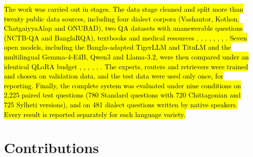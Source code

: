 \hl{The work was carried out in stages. The data stage cleaned and split
more than twenty public data sources, including four dialect corpora
(Vashantor, Kothon, ChatgaiyyaAlap and ONUBAD), two QA datasets with
unanswerable questions (NCTB-QA and BanglaRQA), textbooks and medical
resources \cite{faria2023vashantor}, \cite{kothon2026}, \cite{chatgaiyyaalap2025}, \cite{sultana2025onubad}, \cite{nctbqa}, \cite{ekram2022banglarqa},
\cite{khan2023nervous}, \cite{aurpa2026banglameder}. Seven open models, including the Bangla-adapted
TigerLLM and TituLM and the multilingual Gemma-4-E4B, Qwen3 and
Llama-3.2, were then compared under an identical QLoRA budget \cite{raihan2025tigerllm},
\cite{titulm2025}, \cite{gemma4}, \cite{qwen3}, \cite{meta2024llama32}, \cite{dettmers2023qlora}. The experts, routers
and retrievers were trained and chosen on validation data, and the test
data were used only once, for reporting. Finally, the complete system
was evaluated under nine conditions on 2,225 paired test questions (780
Standard questions with 720 Chittagonian and 725 Sylheti versions), and
on 481 dialect questions written by native speakers. Every result is
reported separately for each language variety.}

\section{Contributions}\label{contributions}


